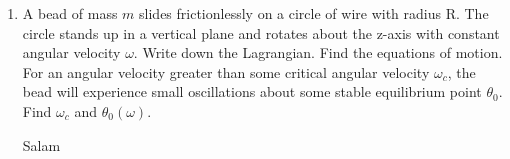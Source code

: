 \documentclass[fleqn]{article}
\begin{document}
\begin{enumerate}
    \item A bead of mass $m$ slides frictionlessly on a circle of wire with radius R.
    The circle stands up in a vertical plane and rotates about the z-axis
    with constant angular velocity $\omega$. Write down the Lagrangian. Find
    the equations of motion. For an angular velocity greater than some
    critical angular velocity $\omega_c$, the bead will experience small oscillations
    about some stable equilibrium point $\theta_0$. Find $\omega_c$ and $\theta_0(\omega)$.

      \textcolor{hwColor}{
         Salam 
      }

  \end{enumerate}
\end{document}

